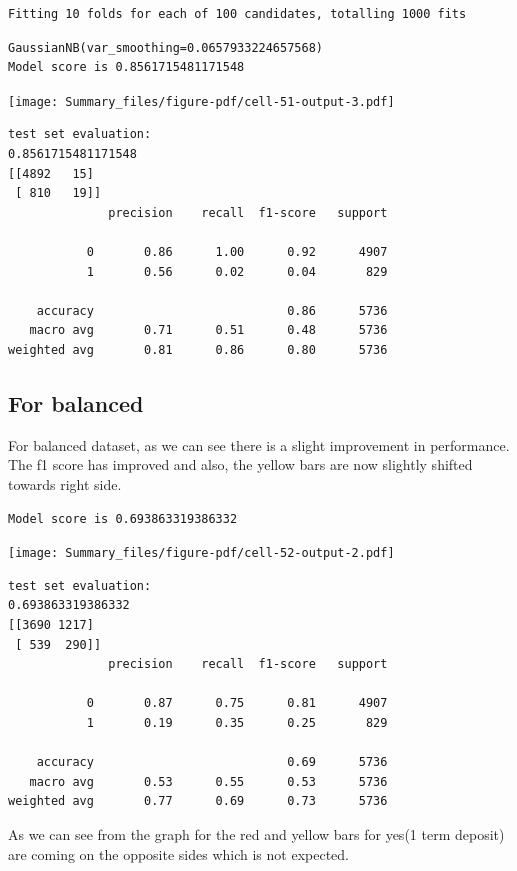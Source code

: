\documentclass[
  letterpaper,
  DIV=11,
  numbers=noendperiod]{scrartcl}
\begin{document}
\begin{verbatim}
Fitting 10 folds for each of 100 candidates, totalling 1000 fits
\end{verbatim}

\begin{verbatim}
GaussianNB(var_smoothing=0.0657933224657568)
Model score is 0.8561715481171548
\end{verbatim}

\texttt{[image: Summary\_files/figure-pdf/cell-51-output-3.pdf]}

\begin{verbatim}
test set evaluation: 
0.8561715481171548
[[4892   15]
 [ 810   19]]
              precision    recall  f1-score   support

           0       0.86      1.00      0.92      4907
           1       0.56      0.02      0.04       829

    accuracy                           0.86      5736
   macro avg       0.71      0.51      0.48      5736
weighted avg       0.81      0.86      0.80      5736
\end{verbatim}

\hypertarget{for-balanced}{%
\subsection{For balanced}\label{for-balanced}}

For balanced dataset, as we can see there is a slight improvement in
performance. The f1 score has improved and also, the yellow bars are now
slightly shifted towards right side.

\begin{verbatim}
Model score is 0.693863319386332
\end{verbatim}

\texttt{[image: Summary\_files/figure-pdf/cell-52-output-2.pdf]}

\begin{verbatim}
test set evaluation: 
0.693863319386332
[[3690 1217]
 [ 539  290]]
              precision    recall  f1-score   support

           0       0.87      0.75      0.81      4907
           1       0.19      0.35      0.25       829

    accuracy                           0.69      5736
   macro avg       0.53      0.55      0.53      5736
weighted avg       0.77      0.69      0.73      5736
\end{verbatim}

As we can see from the graph for the red and yellow bars for yes(1 term
deposit) are coming on the opposite sides which is not expected.
\end{document}
